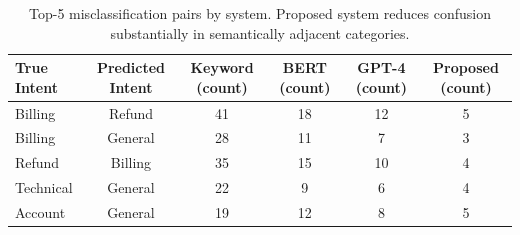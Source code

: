 \begin{table}
\caption{Top-5 misclassification pairs by system. Proposed system reduces confusion substantially in semantically adjacent categories.}
\label{tab:tab06_misclassification}
\begin{tabular}{lccccc}
\toprule
True Intent & Predicted Intent & Keyword (count) & BERT (count) & GPT-4 (count) & Proposed (count) \\
\midrule
Billing & Refund & 41 & 18 & 12 & 5 \\
Billing & General & 28 & 11 & 7 & 3 \\
Refund & Billing & 35 & 15 & 10 & 4 \\
Technical & General & 22 & 9 & 6 & 4 \\
Account & General & 19 & 12 & 8 & 5 \\
\bottomrule
\end{tabular}
\end{table}
